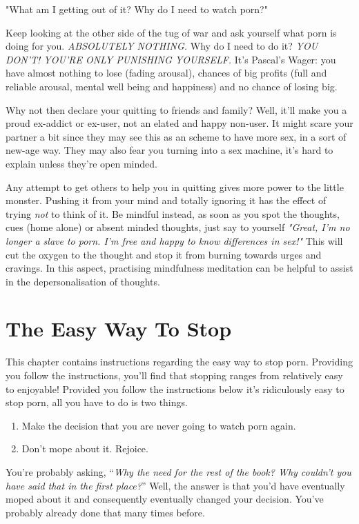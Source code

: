 \documentclass[
]{book}
\begin{document}
"What am I getting out of it? Why do I need to watch porn?"

Keep looking at the other side of the tug of war and ask yourself what porn is doing for you. \emph{ABSOLUTELY NOTHING.} Why do I need to do it? \emph{YOU DON'T! YOU'RE ONLY PUNISHING YOURSELF.} It's Pascal's Wager: you have almost nothing to lose (fading arousal), chances of big profits (full and reliable arousal, mental well being and happiness) and no chance of losing big.

Why not then declare your quitting to friends and family? Well, it'll make you a proud ex-addict or ex-user, not an elated and happy non-user. It might scare your partner a bit since they may see this as an scheme to have more sex, in a sort of new-age way. They may also fear you turning into a sex machine, it's hard to explain unless they're open minded.

Any attempt to get others to help you in quitting gives more power to the little monster. Pushing it from your mind and totally ignoring it has the effect of trying \emph{not} to think of it. Be mindful instead, as soon as you spot the thoughts, cues (home alone) or absent minded thoughts, just say to yourself \emph{"Great, I'm no longer a slave to porn. I'm free and happy to know differences in sex!"} This will cut the oxygen to the thought and stop it from burning towards urges and cravings. In this aspect, practising mindfulness meditation can be helpful to assist in the depersonalisation of thoughts.

\hypertarget{the-easy-way-to-stop}{%
\chapter{The Easy Way To Stop}\label{the-easy-way-to-stop}}

This chapter contains instructions regarding the easy way to stop porn. Providing you follow the instructions, you'll find that stopping ranges from relatively easy to enjoyable! Provided you follow the instructions below it's ridiculously easy to stop porn, all you have to do is two things.

\begin{enumerate}
\def\labelenumi{\arabic{enumi}.}
\item
  Make the decision that you are never going to watch porn again.
\item
  Don't mope about it. Rejoice.
\end{enumerate}

You're probably asking, ``\emph{Why the need for the rest of the book? Why couldn't you have said that in the first place?}'' Well, the answer is that you'd have eventually moped about it and consequently eventually changed your decision. You've probably already done that many times before.
\end{document}
